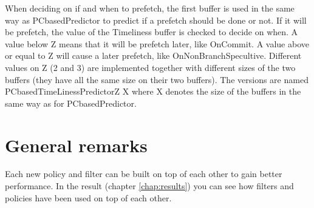 When deciding on if and when to prefetch, the first buffer is used in the same way as PCbasedPredictor to predict if a prefetch should be done or not. If it will be prefetch, the value of the Timeliness buffer is checked to decide on when. A value below Z means that it will be prefetch later, like OnCommit. A value above or equal to Z will cause a later prefetch, like  OnNonBranchSpecultive. Different values on Z (2 and 3) are implemented together with different sizes of the two buffers (they have all the same size on their two buffers). The versions are named PCbasedTimeLinessPredictorZ X where X denotes the size of the buffers in the same way as for PCbasedPredictor. 

\section{General remarks}
Each new policy and filter can be built on top of each other to gain better performance. In the result (chapter \ref{chap:results}) you can see how filters and policies have been used on top of each other.
